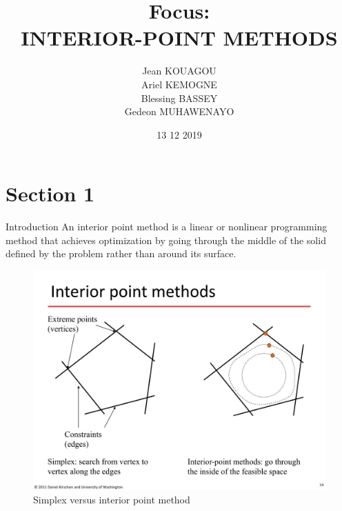 \documentclass{beamer}
\title{Focus: \\ INTERIOR-POINT METHODS}
\author{\small  Jean KOUAGOU\\ Ariel KEMOGNE \\ Blessing BASSEY \\ Gedeon MUHAWENAYO}
\institute{African Masters for Machine Learning}%
\date{13 12 2019}
\begin{document}
\tableofcontents
\begin{frame}
	\maketitle %
\end{frame}


\section{Section 1} %


\begin{frame}{Introduction}
	An interior point method is a linear or nonlinear programming method that achieves optimization by going through the middle of the solid defined by the problem rather than around its surface.
	\begin{figure}
		\centering
		\includegraphics[width=0.6\linewidth]{Images/interior-point-methods-l}
		\caption{Simplex versus interior point method}
	\end{figure}
	
\end{frame}

\end{document}

